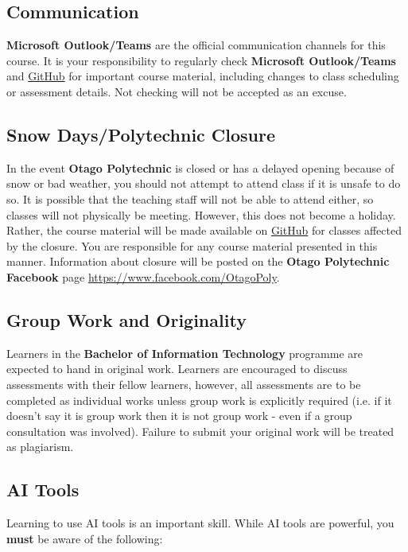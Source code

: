 \documentclass{article}
\begin{document}
\subsection*{Communication}
\textbf{Microsoft Outlook/Teams} are the official communication channels for this course. It is your responsibility to regularly check \textbf{Microsoft Outlook/Teams} and \href{https://github.com/otago-polytechnic-bit-courses/ID511001-programming-2}{GitHub} for important course material, including changes to class scheduling or assessment details. Not checking will not be accepted as an excuse.

\subsection*{Snow Days/Polytechnic Closure}
In the event \textbf{Otago Polytechnic} is closed or has a delayed opening because of snow or bad weather, you should not attempt to attend class if it is unsafe to do so. It is possible that the teaching staff will not be able to attend either, so classes will not physically be meeting. However, this does not become a holiday. Rather, the course material will be made available on \href{https://github.com/otago-polytechnic-bit-courses/ID511001-programming-2}{GitHub} for classes affected by the closure. You are responsible for any course material presented in this manner. Information about closure will be posted on the \textbf{Otago Polytechnic Facebook} page \href{https://www.facebook.com/OtagoPoly}{https://www.facebook.com/OtagoPoly}.

\subsection*{Group Work and Originality}
Learners in the \textbf{Bachelor of Information Technology} programme are expected to hand in original work. Learners are encouraged to discuss assessments with their fellow learners, however, all assessments are to be completed as individual works unless group work is explicitly required (i.e. if it doesn't say it is group work then it is not group work - even if a group consultation was involved). Failure to submit your original work will be treated as plagiarism.

\subsection*{AI Tools}
Learning to use AI tools is an important skill. While AI tools are powerful, you \textbf{must} be aware of the following:
\end{document}

